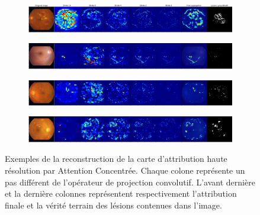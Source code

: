 \begin{figure}[!h]
	\begin{subfigure}{\textwidth}
		\includegraphics[width=\textwidth]{gnuplot/focused_attention/focusedAttention/Example_0}
	\end{subfigure}
	\begin{subfigure}{\textwidth}
	\includegraphics[width=\textwidth]{gnuplot/focused_attention/focusedAttention/Example_2}
	\end{subfigure}
\begin{subfigure}{\textwidth}
	\includegraphics[width=\textwidth]{gnuplot/focused_attention/focusedAttention/Example_3}
\end{subfigure}
\begin{subfigure}{\textwidth}
	\includegraphics[width=\textwidth]{gnuplot/focused_attention/focusedAttention/Example_4}
\end{subfigure}
\caption{Exemples de la reconstruction de la carte d'attribution haute résolution par Attention Concentrée. Chaque colone représente un pas différent de l'opérateur de projection convolutif. L'avant dernière et la dernière colonnes représentent respectivement l'attribution finale et la vérité terrain des lésions contenues dans l'image.}
\label{fig:FocusedAttentionExamples}
\end{figure}

